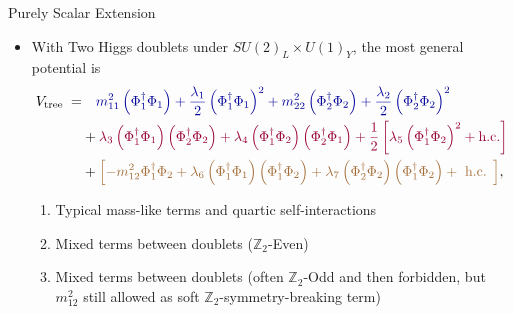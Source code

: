 \documentclass{../bredelebeamer}
\begin{document}
\begin{frame}{Purely Scalar Extension}
    \begin{itemize}
        \item With Two Higgs doublets under $SU(2)_L \times U(1)_Y$, the most general potential is
          {\small
            \begin{align}
              V_{\text {tree }}= 
              &\quad \textcolor{blue!60!black}{m_{11}^2\left(\Phi_1^{\dagger} \Phi_1\right) +\frac{\lambda_1}{2}\left(\Phi_1^{\dagger} \Phi_1\right)^2+ m_{22}^2\left(\Phi_2^{\dagger} \Phi_2\right)
              +\frac{\lambda_2}{2}\left(\Phi_2^{\dagger} \Phi_2\right)^2}\\
              & +\textcolor{purple!80!black}{\lambda_3\left(\Phi_1^{\dagger} \Phi_1\right)\left(\Phi_2^{\dagger} \Phi_2\right)+\lambda_4\left(\Phi_1^{\dagger} \Phi_2\right)\left(\Phi_2^{\dagger} \Phi_1\right) + \frac{1}{2}\left[ \lambda_5\left(\Phi_1^{\dagger} \Phi_2\right)^2 + \text{h.c.}\right]}\\
              & +\textcolor{brown!85!black}{\left[ -m_{12}^2\Phi_1^{\dagger} \Phi_2 +\lambda_6\left(\Phi_1^{\dagger} \Phi_1\right)\left(\Phi_1^{\dagger} \Phi_2\right)+\lambda_7\left(\Phi_2^{\dagger} \Phi_2\right)\left(\Phi_1^{\dagger} \Phi_2\right)+\text { h.c. }\right]},
            \end{align}
          }
          \begin{enumerate}
            \item \textcolor{blue!60!black}{Typical mass-like terms and quartic self-interactions}
            \item \textcolor{purple!80!black}{Mixed terms between doublets ($\mathbb{Z}_2$-Even)}
            \item \textcolor{brown!85!black}{Mixed terms between doublets (often $\mathbb{Z}_2$-Odd and then forbidden, but $m_{12}^2$ still allowed as soft $\mathbb{Z}_2$-symmetry-breaking term)}
          \end{enumerate}


\end{itemize}
\end{frame}
\end{document}
